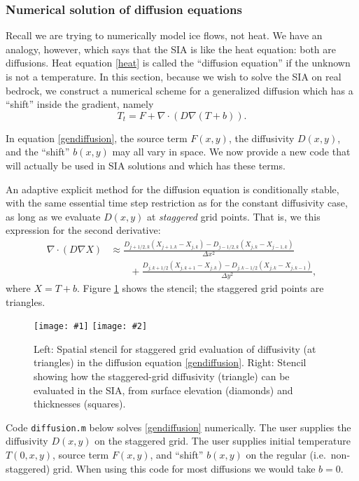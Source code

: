 \documentclass[titlepage,a4paper,final,12pt]{scrartcl}
\newcommand{\grad}{\nabla}
\newcommand{\Div}{\nabla\cdot}
\newcommand{\twofigsizes}[5]{
\begin{figure}[ht]
\centering
\texttt{[image: \#1]} \quad
\texttt{[image: \#2]}
\caption{#3}
\label{fig:#1}
\end{figure}}
\begin{document}
\subsubsection*{Numerical solution of diffusion equations}  Recall we are trying to numerically model ice flows, not heat.  We have an analogy, however, which says that the SIA is like the heat equation: both are diffusions.  Heat equation \eqref{heat} is called the ``diffusion equation'' if the unknown is not a temperature.  In this section, because we wish to solve the SIA on real bedrock, we construct a numerical scheme for a generalized diffusion which has a ``shift'' inside the gradient, namely
\begin{equation}
  T_t = F + \Div \left(D \grad (T + b)\right). \label{gendiffusion}
\end{equation}

In equation \eqref{gendiffusion}, the source term $F(x,y)$, the diffusivity $D(x,y)$, and the ``shift'' $b(x,y)$ may all vary in space.  We now provide a new code that will actually be used in SIA solutions and which has these terms.

An adaptive explicit method for the diffusion equation is conditionally stable, with the same essential time step restriction as for the constant diffusivity case, as long as we evaluate $D(x,y)$ at \emph{staggered} grid points.  That is, we this expression for the second derivative:
\begin{align*}
\Div \left(D \grad X\right) &\approx \frac{D_{j+1/2,k}(X_{j+1,k} - X_{j,k}) - D_{j-1/2,k}(X_{j,k} - X_{j-1,k})}{\Delta x^2} \\
	&\qquad + \frac{D_{j,k+1/2}(X_{j,k+1} - X_{j,k}) - D_{j,k-1/2}(X_{j,k} - X_{j,k-1})}{\Delta y^2},
\end{align*}
where $X=T+b$.  Figure \ref{fig:diffstencil} shows the stencil; the staggered grid points are triangles.

\twofigsizes{diffstencil}{mahaffystencil}{Left:  Spatial stencil for staggered grid evaluation of diffusivity (at triangles) in the diffusion equation \eqref{gendiffusion}.  Right: Stencil showing how the staggered-grid diffusivity (triangle) can be evaluated in the SIA, from surface elevation (diamonds) and thicknesses (squares).}{2.2in}{2.2in}

Code \texttt{diffusion.m} below solves \eqref{gendiffusion} numerically.  The user supplies the diffusivity $D(x,y)$ on the staggered grid.  The user supplies initial temperature $T(0,x,y)$, source term $F(x,y)$, and ``shift'' $b(x,y)$ on the regular (i.e.~non-staggered) grid.  When using this code for most diffusions we would take $b=0$.
\end{document}
